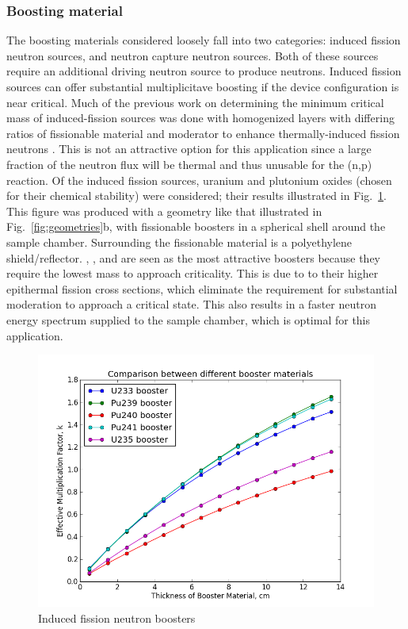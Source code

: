 \documentclass{mc2015}
\begin{document}
\subsubsection{Boosting material}

The boosting materials considered loosely fall into two categories: induced fission neutron sources, and neutron capture neutron sources. Both of these sources require an additional driving neutron source to produce neutrons. Induced fission sources can offer substantial multiplicitave boosting if the device configuration is near critical.  Much of the previous work on determining the minimum critical mass of induced-fission sources  was done with homogenized layers with differing ratios of fissionable material and moderator to enhance thermally-induced fission neutrons \cite{karni_semi-automated_keff,karni_smores_2003,goluoglu_smoresnew_2002}. This is not an attractive option for this application since a large fraction of the neutron flux will be thermal and thus unusable for the (n,p) reaction. Of the induced fission sources, uranium and plutonium oxides (chosen for their chemical stability) were considered; their results illustrated in Fig.\ \ref{fig:boosters}. This figure was produced with a geometry like that illustrated in Fig.\ \ref{fig:geometries}b, with fissionable boosters in a spherical shell around the sample chamber. Surrounding the fissionable material is a polyethylene shield/reflector. , , and  are seen as the most attractive boosters because they require the lowest mass to approach criticality. This is due to to their higher epithermal fission cross sections, which eliminate the requirement for substantial moderation to approach a critical state. This also results in a faster neutron energy spectrum supplied to the sample chamber, which is optimal for this application. 

\begin{figure}
  \centering
  \includegraphics[width=4.5in]{Boosters.png}
  \caption{Induced fission neutron boosters}
  \label{fig:boosters}
\end{figure}
\end{document}
